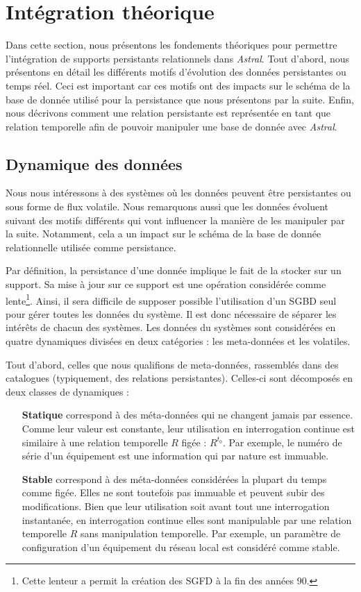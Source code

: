 \section{Intégration théorique}\label{sec:contrib:asteroid:theorie}
Dans cette section, nous présentons les fondements théoriques pour permettre l'intégration de supports persistants relationnels dans \textit{Astral}. Tout d'abord, nous présentons en détail les différents motifs d'évolution des données persistantes ou temps réel. Ceci est important car ces motifs ont des impacts sur le schéma de la base de donnée utilisé pour la persistance que nous présentons par la suite. Enfin, nous décrivons comment une relation persistante est représentée en tant que relation temporelle afin de pouvoir manipuler une base de donnée avec \textit{Astral}.

\subsection{Dynamique des données}
Nous nous intéressons à des systèmes où les données peuvent être persistantes ou sous forme de flux volatile. Nous remarquons aussi que les données évoluent suivant des motifs différents qui vont influencer la manière de les manipuler par la suite. Notamment, cela a un impact sur le schéma de la base de donnée relationnelle utilisée comme persistance.

Par définition, la persistance d'une donnée implique le fait de la stocker sur un support. Sa mise à jour sur ce support est une opération considérée comme lente\footnote{Cette lenteur a permit la création des SGFD à la fin des années 90.}. Ainsi, il sera difficile de supposer possible l'utilisation d'un SGBD seul pour gérer toutes les données du système. Il est donc nécessaire de séparer les intérêts de chacun des systèmes. Les données du systèmes sont considérées en quatre dynamiques divisées en deux catégories : les meta-données et les volatiles. 

Tout d'abord, celles que nous qualifions de meta-données, rassemblés dans des catalogues (typiquement, des relations persistantes). Celles-ci sont décomposés en deux classes de dynamiques :
\begin{itemize}
	\item[\textbf{Statique}] correspond à des méta-données qui ne changent jamais par essence. Comme leur valeur est constante, leur utilisation en interrogation continue est similaire à une relation temporelle $R$ figée : $R^{t_0}$. Par exemple, le numéro de série d'un équipement est une information qui par nature est immuable.
	\item[\textbf{Stable}] correspond à des méta-données considérées la plupart du temps comme figée. Elles ne sont toutefois pas immuable et peuvent subir des modifications. Bien que leur utilisation soit avant tout une interrogation instantanée, en interrogation continue elles sont manipulable par une relation temporelle $R$ sans manipulation temporelle. Par exemple, un paramètre de configuration d'un équipement du réseau local est considéré comme stable.
\end{itemize}

